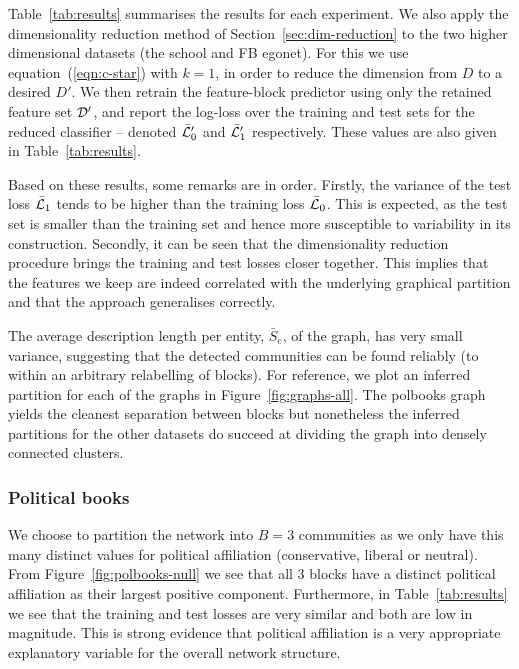 Table~\ref{tab:results} summarises the results for each experiment. We also apply the 
dimensionality reduction method 
of Section~\ref{sec:dim-reduction}
to the two higher dimensional datasets (the school and FB egonet). 
For this we use equation~(\ref{eqn:c-star}) with $k=1$,
in order to reduce the dimension from 
$D$ to a desired $D'$. 
We then retrain the feature-block predictor using only the retained 
feature set $\mathcal{D}'$, and report the log-loss over the training and 
test sets for the reduced classifier -- 
denoted $\bar{\mathcal{L}}_0'$ and $\bar{\mathcal{L}}_1'$ respectively. 
These values are also given in Table~\ref{tab:results}.

Based on these results, some remarks are in order.
Firstly, the variance of the test loss $\bar{\mathcal{L}}_1$ tends to be higher 
than the training loss $\bar{\mathcal{L}}_0$. This is expected,
as the test set is smaller than the training set and hence 
more susceptible to variability in its construction. 
Secondly, it can be seen that the dimensionality reduction procedure 
brings the training and test losses closer together. This implies that 
the features we keep are indeed correlated with the underlying graphical 
partition and that the approach generalises correctly.

The average description length per entity,
$\bar{S}_e$, of the graph, 
has very small variance, suggesting that
the detected communities can be found reliably (to within an arbitrary 
relabelling of blocks). For reference, we plot an inferred partition for each 
of the graphs in Figure~\ref{fig:graphs-all}. The polbooks graph yields the cleanest separation between blocks but nonetheless the inferred partitions for the other datasets do succeed at dividing the graph into densely connected clusters.

\subsubsection{Political books}

We choose to partition the network into $B=3$ communities as we only have this many distinct values for political affiliation (conservative, liberal or neutral).
From Figure~\ref{fig:polbooks-null} we see that all 3 blocks have a distinct political affiliation as their largest positive component.  
Furthermore, in Table~\ref{tab:results} we see that the training and test losses 
are very similar and both are low in magnitude. This is strong evidence 
that political affiliation is a very appropriate explanatory 
variable for the overall network structure.

